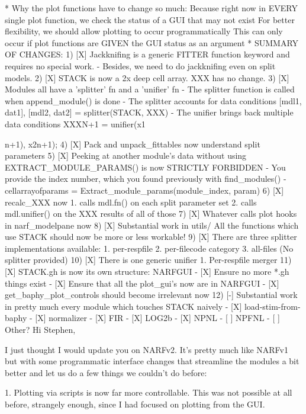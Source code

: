 {* Why the plot functions have to change so much:
  Because right now in EVERY single plot function, we check the status of a GUI that may not exist
  For better flexibility, we should allow plotting to occur programmatically
  This can only occur if plot functions are GIVEN the GUI status as an argument
* SUMMARY OF CHANGES:
  1) [X] Jackknifing is a generic FITTER function keyword and requires no special work.
         - Besides, we need to do jackknifing even on split models.
  2) [X] STACK is now a 2x deep cell array. XXX has no change.
  3) [X] Modules all have a 'splitter' fn and a 'unifier' fn
	 - The splitter function is called when append_module() is done
	 - The splitter accounts for data conditions
	   {[mdl1, dat1], [mdl2, dat2]} = splitter(STACK, XXX)
	 - The unifier brings back multiple data conditions
	   XXX{N+1} = unifier(x1{n+1), x2{n+1});
  4) [X] Pack and unpack_fittables now understand split parameters
  5) [X] Peeking at another module's data without using EXTRACT_MODULE_PARAMS() is now STRICTLY FORBIDDEN
         - You provide the index number, which you found previously with find_modules()
	 - {cellarrayofparams} = Extract_module_params(module_index, param) 
  6) [X] recalc_XXX now 
	   1. calls mdl.fn() on each split parameter set
	   2. calls mdl.unifier() on the XXX results of all of those
  7) [X] Whatever calls plot hooks in narf_modelpane now
  8) [X] Substantial work in utils/
	 All the functions which use STACK should now be more or less workable!	  
  9) [X] There are three splitter implementations available:
	 1. per-respfile
	 2. per-filecode category
	 3. all-files (No splitter provided)
  10) [X] There is one generic unifier
          1. Per-respfile merger
  11) [X] STACK{}.gh is now its own structure: NARFGUI
	  - [X] Ensure no more *.gh things exist
	  - [X] Ensure that all the plot_gui's now are in NARFGUI
	  - [X] get_baphy_plot_controls should become irrelevant now
  12) [-] Substantial work in pretty much every module which touches STACK naively
	  - [X] load-stim-from-baphy
	  - [X] normalizer
	  - [X] FIR
	  - [X] LOG2b
	  - [X] NPNL
	  - [ ] NPFNL
	  - [ ] Other?
Hi Stephen, 

I just thought I would update you on NARFv2. It's pretty much like NARFv1 but with some programmatic interface changes that streamline the modules a bit better and let us do a few things we couldn't do before:

1. Plotting via scripts is now far more controllable. This was not possible at all before, strangely enough, since I had focused on plotting from the GUI.

}}
